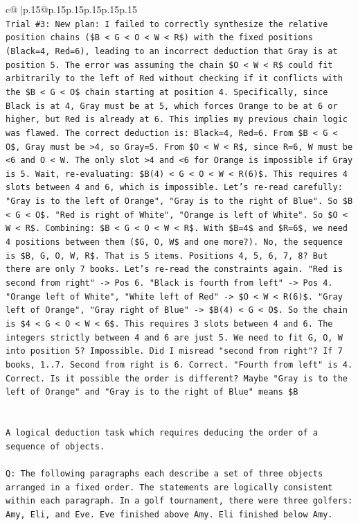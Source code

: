 \documentclass{article}
\begin{document}
{\begin{supertabular}{c@{$\;$}|p{.15\linewidth}@{}p{.15\linewidth}p{.15\linewidth}p{.15\linewidth}p{.15\linewidth}p{.15\linewidth}}
{{{\\ 
\texttt{Trial \#3: New plan: I failed to correctly synthesize the relative position chains (\$B < G < O < W < R\$) with the fixed positions (Black=4, Red=6), leading to an incorrect deduction that Gray is at position 5. The error was assuming the chain \$O < W < R\$ could fit arbitrarily to the left of Red without checking if it conflicts with the \$B < G < O\$ chain starting at position 4. Specifically, since Black is at 4, Gray must be at 5, which forces Orange to be at 6 or higher, but Red is already at 6. This implies my previous chain logic was flawed. The correct deduction is: Black=4, Red=6. From \$B < G < O\$, Gray must be >4, so Gray=5. From \$O < W < R\$, since R=6, W must be <6 and O < W. The only slot >4 and <6 for Orange is impossible if Gray is 5. Wait, re{-}evaluating: \$B(4) < G < O < W < R(6)\$. This requires 4 slots between 4 and 6, which is impossible. Let's re{-}read carefully: "Gray is to the left of Orange", "Gray is to the right of Blue". So \$B < G < O\$. "Red is right of White", "Orange is left of White". So \$O < W < R\$. Combining: \$B < G < O < W < R\$. With \$B=4\$ and \$R=6\$, we need 4 positions between them (\$G, O, W\$ and one more?). No, the sequence is \$B, G, O, W, R\$. That is 5 items. Positions 4, 5, 6, 7, 8? But there are only 7 books. Let's re{-}read the constraints again. "Red is second from right" {-}> Pos 6. "Black is fourth from left" {-}> Pos 4. "Orange left of White", "White left of Red" {-}> \$O < W < R(6)\$. "Gray left of Orange", "Gray right of Blue" {-}> \$B(4) < G < O\$. So the chain is \$4 < G < O < W < 6\$. This requires 3 slots between 4 and 6. The integers strictly between 4 and 6 are just 5. We need to fit G, O, W into position 5? Impossible. Did I misread "second from right"? If 7 books, 1..7. Second from right is 6. Correct. "Fourth from left" is 4. Correct. Is it possible the order is different? Maybe "Gray is to the left of Orange" and "Gray is to the right of Blue" means \$B} \\
\\ 
\\ 
\texttt{A logical deduction task which requires deducing the order of a sequence of objects.} \\
\\ 
\texttt{Q: The following paragraphs each describe a set of three objects arranged in a fixed order. The statements are logically consistent within each paragraph. In a golf tournament, there were three golfers: Amy, Eli, and Eve. Eve finished above Amy. Eli finished below Amy.} \\
}}}
\end{supertabular}}
\end{document}
